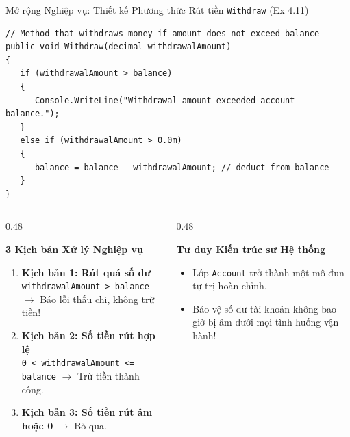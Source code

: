 \documentclass[aspectratio=169, 10pt]{beamer}
\begin{document}
\begin{frame}[fragile]{Mở rộng Nghiệp vụ: Thiết kế Phương thức Rút tiền \texttt{Withdraw} (Ex 4.11)}
  \begin{tcolorbox}[colback=CodeBg,colframe=UniNavy,title=\textbf{Phương thức Rút tiền An toàn trong Account.cs},fonttitle=\small\bfseries]
\begin{lstlisting}
// Method that withdraws money if amount does not exceed balance
public void Withdraw(decimal withdrawalAmount)
{
   if (withdrawalAmount > balance)
   {
      Console.WriteLine("Withdrawal amount exceeded account balance.");
   }
   else if (withdrawalAmount > 0.0m)
   {
      balance = balance - withdrawalAmount; // deduct from balance
   }
}
\end{lstlisting}
  \end{tcolorbox}
  \begin{columns}[T]
    \begin{column}{0.48\textwidth}
      \begin{block}{\textbf{3 Kịch bản Xử lý Nghiệp vụ}}
        \begin{enumerate}\small
          \item \textbf{Kịch bản 1: Rút quá số dư}\\
          \texttt{withdrawalAmount > balance} $\to$ Báo lỗi thấu chi, không trừ tiền!
          \item \textbf{Kịch bản 2: Số tiền rút hợp lệ}\\
          \texttt{0 < withdrawalAmount <= balance} $\to$ Trừ tiền thành công.
          \item \textbf{Kịch bản 3: Số tiền rút âm hoặc 0} $\to$ Bỏ qua.
        \end{enumerate}
      \end{block}
    \end{column}

    \begin{column}{0.48\textwidth}
      \begin{exampleblock}{\textbf{Tư duy Kiến trúc sư Hệ thống}}
        \begin{itemize}\small
          \item Lớp \texttt{Account} trở thành một mô đun tự trị hoàn chỉnh.
          \item Bảo vệ số dư tài khoản không bao giờ bị âm dưới mọi tình huống vận hành!
        \end{itemize}
      \end{exampleblock}
    \end{column}
  \end{columns}
\end{frame}
\end{document}

